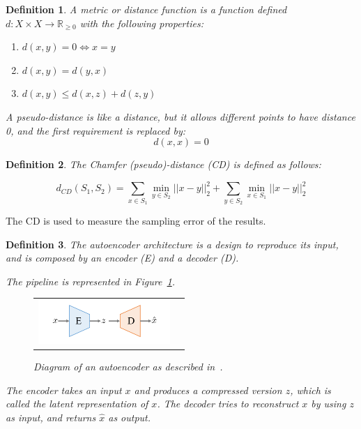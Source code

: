 \documentclass[12pt]{article}
\newtheorem{definition}{Definition}
\begin{document}
    \begin{definition}
        \normalfont
        A \emph{metric} or \emph{distance function} is a function defined
        $d: X \times X \to \mathbb{R}_{\geq 0}$
        with the following properties:

        \begin{enumerate}
            \item $d(x,y) = 0 \Leftrightarrow x = y$
            \item $d(x,y) = d(y,x)$
            \item $d(x,y) \leq d(x,z) + d(z,y)$
        \end{enumerate}

        A \emph{pseudo-distance} is like a distance, but it allows different points to have distance 0, and the first requirement is replaced by:
        \[d(x,x) = 0\]
    \end{definition}

    \begin{definition}
        \normalfont
        The \emph{Chamfer (pseudo)-distance (CD)} is defined as follows:

        \[d_{CD}(S_{1}, S_{2}) = \sum_{x \in S_{1}} \min _{y \in S_{2}} || x - y||_{2}^{2} +
        \sum_{y \in S_{2}} \min_{x \in S_{1}} ||x - y||_{2}^{2}\]
    \end{definition}


    The CD is used to measure the sampling error of the results.

    \begin{definition}
        \normalfont
        The \emph{autoencoder} architecture is a design to reproduce its input, and is composed by an \emph{encoder} (E) and a \emph{decoder} (D).

        The pipeline is represented in Figure~\ref{figure:diagram_of_autoencoder}.

        \begin{figure}[H]
            \centering
            \begin{tabular}{cc}
                \includegraphics[width = 50mm]{autoencoder}
            \end{tabular}
            \caption{Diagram of an autoencoder as described in~\cite{pmlr-v80-achlioptas18a}.}
            \label{figure:diagram_of_autoencoder}
        \end{figure}

        The encoder takes an input $x$ and produces a compressed version $z$, which is called the \emph{latent representation} of $x$. The decoder tries to reconstruct $x$ by using $z$ as input, and returns $\hat{x}$ as output.
    \end{definition}
\end{document}
